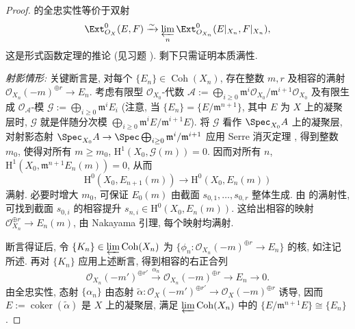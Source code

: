 \begin{proof}
 的全忠实性等价于双射
\[
\Ext^0_{\mathcal O_X}(E,F)\xrightarrow\sim\varprojlim_n\Ext^0_{\mathcal O_{X_n}}(E|_{X_n},F|_{X_n}),
\]
这是形式函数定理的推论 (见习题 ). 剩下只需证明本质满性.

\textit{射影情形:} 关键断言是, 对每个 $\{E_n\}\in\operatorname{Coh}(X_n)$, 存在整数 $m,r$ 及相容的满射 $\mathcal O_{X_n}(-m)^{\oplus r}\to E_n$. 考虑有限型 $\mathcal O_{X_0}$-代数 $\mathcal A:=\bigoplus_{i\geq0}\mathfrak m^i\mathcal O_{X_0}/\mathfrak m^{i+1}\mathcal O_{X_0}$ 及有限生成 $\mathcal O_{\mathcal A}$-模 $\mathcal G:=\bigoplus_{i\geq0}\mathfrak m^iE_i$ (注意, 当 $\{E_n\}=\{E/\mathfrak m^{n+1}\}$, 其中 $E$ 为 $X$ 上的凝聚层时, $\mathcal G$ 就是伴随分次模 $\bigoplus_{i\geq0}\mathfrak m^iE/\mathfrak m^{i+1}E$). 将 $\mathcal G$ 看作 $\Spec_{X_0}\mathcal A$ 上的凝聚层, 对射影态射 $\Spec_{X_0}\mathcal A\to\Spec\bigoplus_{i\geq0}\mathfrak m^i/\mathfrak m^{i+1}$ 应用 Serre 消灭定理 \cite[定理 II.5.2]{Har77}, 得到整数 $m_0$, 使得对所有 $m\geq m_0$, $\mathrm H^1(X_0,\mathcal G(m))=0$. 因而对所有 $n$, $\mathrm H^1(X_0,\mathfrak m^{n+1}E_n(m))=0$, 从而
\begin{equation}\label{src:C.5.6}
\mathrm H^0(X_0,E_{n+1}(m))\to\mathrm H^0(X_0,E_n(m))
\end{equation}
满射. 必要时增大 $m_0$, 可保证 $E_0(m)$ 由截面 $s_{0,1},\ldots,s_{0,r}$ 整体生成. 由  的满射性, 可找到截面 $s_{0,i}$ 的相容提升 $s_{n,i}\in\mathrm H^0(X_0,E_n(m))$. 这给出相容的映射 $\mathcal O_{X_n}^{\oplus r}\to E_n(m)$, 由 Nakayama 引理, 每个映射均满射.

断言得证后, 令 $\{K_n\}\in\varprojlim\operatorname{Coh}(X_n)$ 为 $\{\phi_n:\mathcal O_{X_n}(-m)^{\oplus r}\to E_n\}$ 的核, 如注记  所述. 再对 $\{K_n\}$ 应用上述断言, 得到相容的右正合列
\[
\mathcal O_{X_n}(-m')^{\oplus r'}\xrightarrow{\alpha_n}\mathcal O_{X_n}(-m)^{\oplus r}\to E_n\to0.
\]
由全忠实性, 态射 $\{\alpha_n\}$ 由态射 $\widetilde\alpha:\mathcal O_X(-m')^{\oplus r'}\to\mathcal O_X(-m)^{\oplus r}$ 诱导, 因而 $E:=\operatorname{coker}(\widetilde\alpha)$ 是 $X$ 上的凝聚层, 满足 $\varprojlim\operatorname{Coh}(X_n)$ 中的 $\{E/\mathfrak m^{n+1}E\}\cong\{E_n\}$.


\end{proof}
